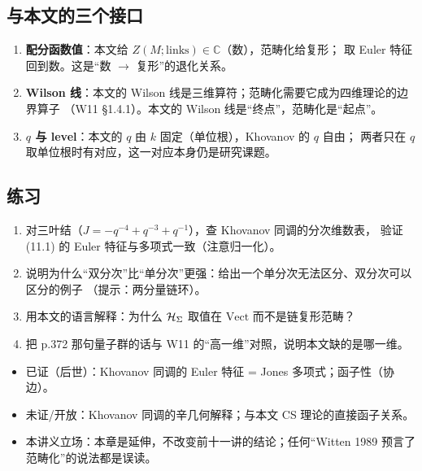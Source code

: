 \subsection{与本文的三个接口}
\begin{enumerate}[leftmargin=*]
  \item \textbf{配分函数值}：本文给 $Z(M;\text{links})\in\mathbb C$（数），范畴化给复形；
        取 Euler 特征回到数。这是“数 $\to$ 复形”的退化关系。
  \item \textbf{Wilson 线}：本文的 Wilson 线是三维算符；范畴化需要它成为四维理论的边界算子
        （W11 \S1.4.1）。本文的 Wilson 线是“终点”，范畴化是“起点”。
  \item \textbf{$q$ 与 level}：本文的 $q$ 由 $k$ 固定（单位根），Khovanov 的 $q$ 自由；
        两者只在 $q$ 取单位根时有对应，这一对应本身仍是研究课题。
\end{enumerate}

\subsection{练习}
\begin{enumerate}[leftmargin=*]
  \item 对三叶结（$J=-q^{-4}+q^{-3}+q^{-1}$），查 Khovanov 同调的分次维数表，
        验证 (11.1) 的 Euler 特征与多项式一致（注意归一化）。
  \item 说明为什么“双分次”比“单分次”更强：给出一个单分次无法区分、双分次可以区分的例子
        （提示：两分量链环）。
  \item 用本文的语言解释：为什么 $\mathcal{H}_\Sigma$ 取值在 $\mathrm{Vect}$ 而不是链复形范畴？
  \item 把 p.372 那句量子群的话与 W11 的“高一维”对照，说明本文缺的是哪一维。
\end{enumerate}

\begin{boundary}
\begin{itemize}
  \item 已证（后世）：Khovanov 同调的 Euler 特征 = Jones 多项式；函子性（协边）。
  \item 未证/开放：Khovanov 同调的辛几何解释；与本文 CS 理论的直接函子关系。
  \item 本讲义立场：本章是延伸，不改变前十一讲的结论；任何“Witten 1989 预言了范畴化”的说法都是误读。
\end{itemize}
\end{boundary}
